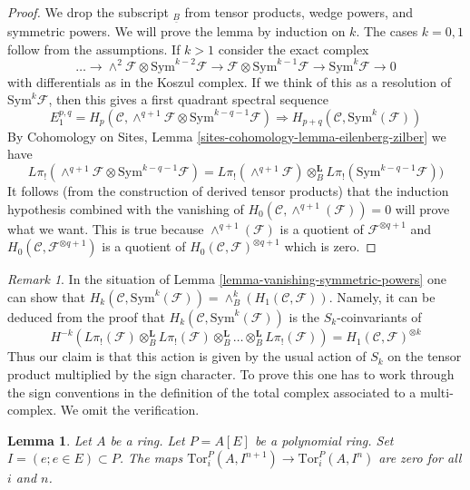 \documentclass{stacks-project}
\theoremstyle{plain}
\newtheorem{lemma}[subsection]{Lemma}
\theoremstyle{definition}
\theoremstyle{remark}
\newtheorem{remark}[subsection]{Remark}
\numberwithin{equation}{subsection}
\begin{document}
\begin{proof}
We drop the subscript ${}_{\underline{B}}$ from tensor products, wedge powers,
and symmetric powers. We will prove the lemma by induction on $k$.
The cases $k = 0, 1$ follow from the assumptions. If $k > 1$ consider
the exact complex
$$
\ldots \to
\wedge^2\mathcal{F} \otimes \text{Sym}^{k - 2}\mathcal{F} \to
\mathcal{F} \otimes \text{Sym}^{k - 1}\mathcal{F} \to
\text{Sym}^k\mathcal{F} \to 0
$$
with differentials as in the Koszul complex. If we think of this as a
resolution of $\text{Sym}^k\mathcal{F}$, then this gives a first quadrant
spectral sequence
$$
E_1^{p, q} =
H_p(\mathcal{C},
\wedge^{q + 1}\mathcal{F} \otimes \text{Sym}^{k - q - 1}\mathcal{F})
\Rightarrow
H_{p + q}(\mathcal{C}, \text{Sym}^k(\mathcal{F}))
$$
By Cohomology on Sites, Lemma \ref{sites-cohomology-lemma-eilenberg-zilber}
we have
$$
L\pi_!(\wedge^{q + 1}\mathcal{F} \otimes \text{Sym}^{k - q - 1}\mathcal{F}) =
L\pi_!(\wedge^{q + 1}\mathcal{F}) \otimes_B^\mathbf{L}
L\pi_!(\text{Sym}^{k - q - 1}\mathcal{F}))
$$
It follows (from the construction of derived tensor products) that
the induction hypothesis combined with the vanishing
of $H_0(\mathcal{C}, \wedge^{q + 1}(\mathcal{F})) = 0$ will prove what we want.
This is true because $\wedge^{q + 1}(\mathcal{F})$ is a quotient
of $\mathcal{F}^{\otimes q + 1}$ and
$H_0(\mathcal{C}, \mathcal{F}^{\otimes q + 1})$
is a quotient of $H_0(\mathcal{C}, \mathcal{F})^{\otimes q + 1}$
which is zero.
\end{proof}

\begin{remark}
\label{remark-first-homology-symmetric-power}
In the situation of Lemma \ref{lemma-vanishing-symmetric-powers}
one can show that
$H_k(\mathcal{C}, \text{Sym}^k(\mathcal{F})) =
\wedge^k_B(H_1(\mathcal{C}, \mathcal{F}))$.
Namely, it can be deduced from the proof that
$H_k(\mathcal{C}, \text{Sym}^k(\mathcal{F}))$ is the $S_k$-coinvariants
of
$$
H^{-k}(L\pi_!(\mathcal{F}) \otimes_B^\mathbf{L}
L\pi_!(\mathcal{F}) \otimes_B^\mathbf{L}
\ldots \otimes_B^\mathbf{L} L\pi_!(\mathcal{F})) =
H_1(\mathcal{C}, \mathcal{F})^{\otimes k}
$$
Thus our claim is that this action is given by the usual action
of $S_k$ on the tensor product multiplied by the sign character.
To prove this one has to work through the sign conventions
in the definition of the total complex associated to a
multi-complex. We omit the verification.
\end{remark}

\begin{lemma}
\label{lemma-map-tors-zero}
Let $A$ be a ring. Let $P = A[E]$ be a polynomial ring.
Set $I = (e; e \in E) \subset P$. The maps
$\text{Tor}_i^P(A, I^{n + 1}) \to \text{Tor}_i^P(A, I^n)$
are zero for all $i$ and $n$.
\end{lemma}
\end{document}
